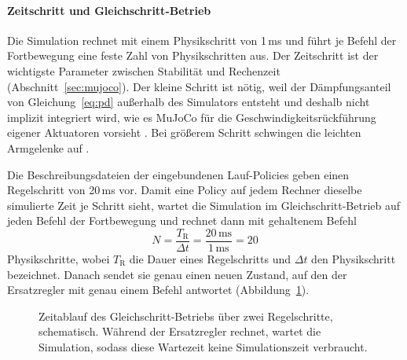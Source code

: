 \paragraph*{Zeitschritt und Gleichschritt-Betrieb}
\label{sec:zeitschritt}%
Die Simulation rechnet mit einem Physikschritt von 1\,ms und führt je Befehl der Fortbewegung eine feste Zahl von Physikschritten aus.
Der Zeitschritt ist der wichtigste Parameter zwischen Stabilität und Rechenzeit (Abschnitt~\ref{sec:mujoco}).
Der kleine Schritt ist nötig, weil der Dämpfungsanteil von Gleichung~\ref{eq:pd} außerhalb des Simulators entsteht und deshalb nicht implizit integriert wird, wie es MuJoCo für die Geschwindigkeitsrückführung eigener Aktuatoren vorsieht \cite{MujocoDoku2026b}.
Bei größerem Schritt schwingen die leichten Armgelenke auf .

Die Beschreibungsdateien der eingebundenen Lauf-Policies geben einen Regelschritt von 20\,ms vor.
Damit eine Policy auf jedem Rechner dieselbe simulierte Zeit je Schritt sieht, wartet die Simulation im Gleichschritt-Betrieb auf jeden Befehl der Fortbewegung und rechnet dann mit gehaltenem Befehl
\begin{equation}
  N = \frac{T_{\mathrm{R}}}{\Delta t} = \frac{20\,\mathrm{ms}}{1\,\mathrm{ms}} = 20
  \label{eq:physikschritte}
\end{equation}
%
Physikschritte, wobei $T_{\mathrm{R}}$ die Dauer eines Regelschritts und $\Delta t$ den Physikschritt bezeichnet.
Danach sendet sie genau einen neuen Zustand, auf den der Ersatzregler mit genau einem Befehl antwortet (Abbildung~\ref{fig:lockstep}).

\begin{figure}[htbp]
  \centering
  
  \caption[Zeitablauf des Gleichschritt-Betriebs]{Zeitablauf des Gleichschritt-Betriebs über zwei Regelschritte, schematisch. Während der Ersatzregler rechnet, wartet die Simulation, sodass diese Wartezeit keine Simulationszeit verbraucht.}
  \label{fig:lockstep}
\end{figure}


